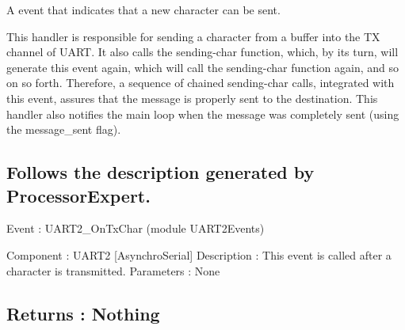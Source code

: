 A event that indicates that a new character can be sent. 

This handler is responsible for sending a character from a buffer into the TX channel of U\+A\+RT. It also calls the sending-\/char function, which, by its turn, will generate this event again, which will call the sending-\/char function again, and so on so forth. Therefore, a sequence of chained sending-\/char calls, integrated with this event, assures that the message is properly sent to the destination. This handler also notifies the main loop when the message was completely sent (using the message\+\_\+sent flag).

\subsection*{Follows the description generated by Processor\+Expert. }

Event \+: U\+A\+R\+T2\+\_\+\+On\+Tx\+Char (module U\+A\+R\+T2\+Events)

Component \+: U\+A\+R\+T2 \mbox{[}Asynchro\+Serial\mbox{]} Description \+: This event is called after a character is transmitted. Parameters \+: None \subsection*{Returns \+: Nothing }